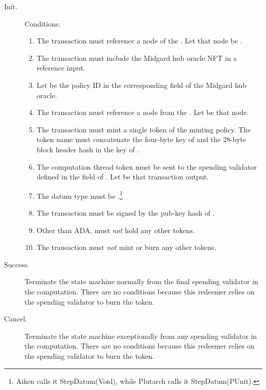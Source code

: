 \documentclass[../midgard.tex]{subfiles}
\begin{document}
\begin{description}
    \item[Init.] Conditions:
        \begin{enumerate}
            \item The transaction must reference a node of the .
              Let that node be .
            \item The transaction must include the Midgard hub oracle NFT in a reference input.
            \item Let  be the policy ID in the corresponding field of the Midgard hub oracle.
            \item The transaction must reference a node from the .
              Let  be that node.
            \item The transaction must mint a single token of the  minting policy.
              The token name must concatenate the four-byte key of  and the 28-byte block header hash in the key of .
            \item The computation thread token must be sent to the spending validator defined in the  field of .
              Let  be that transaction output.
            \item The  datum type must be .\footnote{Aiken calls it StepDatum(Void), while Plutarch calls it StepDatum(PUnit).} 
            \item The transaction must be signed by the  pub-key hash of .
            \item Other than ADA,  must \emph{not} hold any other tokens.
            \item The transaction must \emph{not} mint or burn any other tokens.
        \end{enumerate}
    \item[Success.] Terminate the state machine normally from the final spending validator in the computation.
      There are no conditions because this redeemer relies on the spending validator to burn the token.
    \item[Cancel.] Terminate the state machine exceptionally from any spending validator in the computation.
      There are no conditions because this redeemer relies on the spending validator to burn the token.
\end{description}
\end{document}
